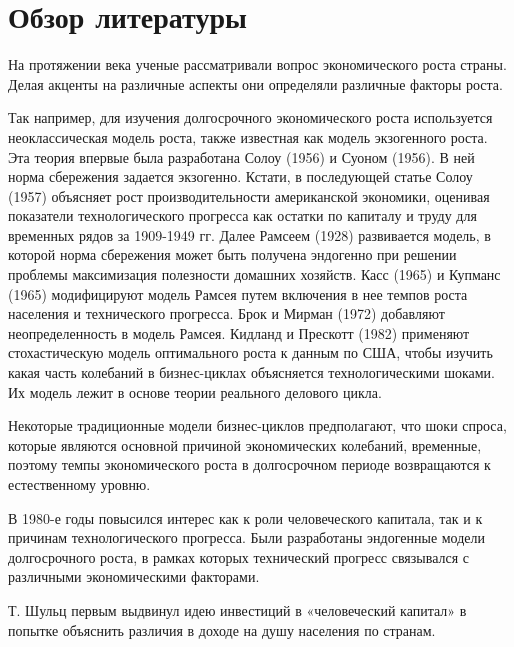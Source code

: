 \documentclass[12pt,a4paper, oneside]{extreport}
\begin{document}
\section{Обзор литературы}


На протяжении века ученые рассматривали вопрос экономического роста страны.  Делая акценты на различные аспекты они определяли различные факторы роста. 

Так например, для изучения долгосрочного экономического роста используется неоклассическая модель роста, также известная как модель экзогенного роста. Эта теория впервые была разработана Солоу (1956) и Суоном (1956).  В ней норма сбережения задается экзогенно.  
Кстати, в последующей  статье Солоу (1957) объясняет рост производительности  американской экономики,  оценивая показатели технологического прогресса  как остатки по  капиталу и труду  для временных рядов  за  1909-1949 гг.
Далее Рамсеем (1928) развивается  модель, в которой  норма сбережения может быть получена эндогенно при решении проблемы максимизация полезности домашних хозяйств. Касс (1965) и Купманс (1965) модифицируют модель Рамсея путем включения в нее темпов роста населения и технического прогресса. Брок и Мирман (1972) добавляют  неопределенность в модель Рамсея.
Кидланд и Прескотт (1982) применяют стохастическую модель  оптимального  роста  к данным по США, чтобы  изучить какая часть колебаний в бизнес-циклах объясняется технологическими  шоками.  Их модель лежит в основе     теории реального делового цикла.

Некоторые традиционные модели бизнес-циклов предполагают, что шоки спроса, которые являются основной  причиной  экономических колебаний,  временные, поэтому темпы  экономического роста в долгосрочном периоде   возвращаются к естественному уровню. 



В 1980-е годы повысился  интерес как к роли человеческого капитала, так  и к причинам  технологического прогресса. Были разработаны эндогенные модели долгосрочного роста, в рамках которых  технический прогресс связывался  с различными  экономическими факторами. 


Т. Шульц первым выдвинул идею инвестиций в «человеческий капитал» в попытке объяснить  различия в доходе на душу населения
по странам. 
\end{document}

